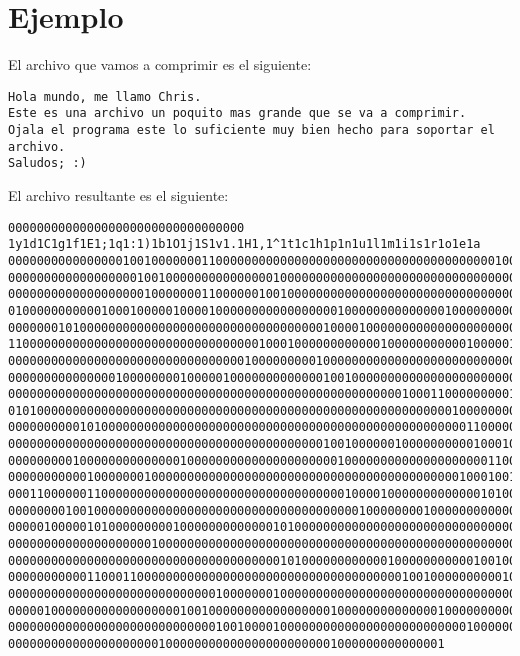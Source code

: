 \documentclass[a4paper,12pt]{article}
\begin{document}
    \section{Ejemplo}
    El archivo que vamos a comprimir es el siguiente:
    \begin{lstlisting}
Hola mundo, me llamo Chris.
Este es una archivo un poquito mas grande que se va a comprimir.
Ojala el programa este lo suficiente muy bien hecho para soportar el archivo.
Saludos; :)
    \end{lstlisting}
    El archivo resultante es el siguiente:
    \begin{lstlisting}
000000000000000000000000000000000 1y1d1C1g1f1E1;1q1:1)1b1O1j1S1v1.1H1,1^1t1c1h1p1n1u1l1m1i1s1r1o1e1a
00000000000000001001000000011000000000000000000000000000000000000000100000000100000000010000000000000
00000000000000000010010000000000000001000000000000000000000000000000000000000101000000000000000000000
00000000000000000001000000011000000100100000000000000000000000000000000000000000000000000000000000000
01000000000001000100000100001000000000000000001000000000000001000000000000000000000000000100001000000
00000001010000000000000000000000000000000000100001000000000000000000000000000000000000000001000000000
11000000000000000000000000000000000100010000000000001000000000001000001000000000000000000100100000000
00000000000000000000000000000000010000000001000000000000000000000000000000000000000000010010000000000
00000000000000010000000010000010000000000000100100000000000000000000000000000000000000011000010000000
00000000000000000000000000000000000000000000000000000001000110000000001000000000000000000000000000000
01010000000000000000000000000000000000000000000000000000000000100000000101000000000000000000000000000
00000000001010000000000000000000000000000000000000000000000000001100000000000000000000000000000000010
00000000000000000000000000000000000000000000100100000010000000000100010000010000001000001000100000000
00000000010000000000000010000000000000000000001000000000000000000001100000001100000000000000000000000
00000000000100000001000000000000000000000000000000000000000000010001001000000000000000000000000000001
00011000000110000000000000000000000000000000000100001000000000000010100000000000000000000000000000000
00000000100100000000000000000000000000000000000001000000001000000000000000000000000000010000010000000
00000100000101000000000100000000000001010000000000000000000000000000000000000001000000001000000000000
00000000000000000000100000000000000000000000000000000000000000000000000000001000001010000000001000000
00000000000000000000000000000000000000101000000000000100000000000100100000000000000000000000000000000
00000000000110001100000000000000000000000000000000000001001000000000010010001000000000000011000100000
00000000000000000000000000000100000001000000000000000000000000000000000100010000000000001000000000001
00000100000000000000000010010000000000000000010000000000000010000000000000000000110000000100000000100
00000000000000000000000000000100100001000000000000000000000000001000000000000000000000000000000000000
0000000000000000000001000000000000000000000001000000000000001

    \end{lstlisting}

    

    
\end{document}
